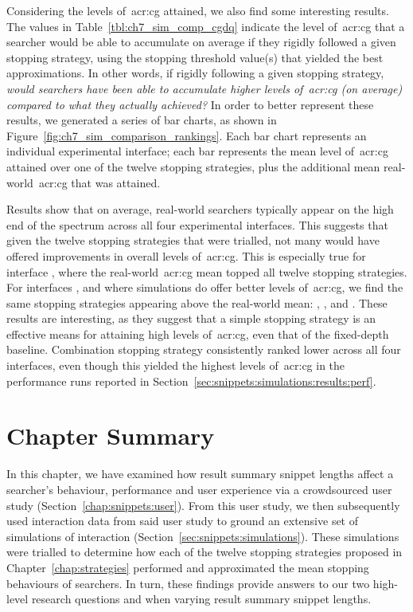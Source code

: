 Considering the levels of~\gls{acr:cg} attained, we also find some interesting results. The values in Table~\ref{tbl:ch7_sim_comp_cgdq} indicate the level of~\gls{acr:cg} that a searcher would be able to accumulate on average if they rigidly followed a given stopping strategy, using the stopping threshold value(s) that yielded the best approximations. In other words, if rigidly following a given stopping strategy, \emph{would searchers have been able to accumulate higher levels of~\gls{acr:cg} (on average) compared to what they actually achieved?} In order to better represent these results, we generated a series of bar charts, as shown in Figure~\ref{fig:ch7_sim_comparison_rankings}. Each bar chart represents an individual experimental interface; each bar represents the mean level of~\gls{acr:cg} attained over one of the twelve stopping strategies, plus the additional mean real-world~\gls{acr:cg} that was attained.

Results show that on average, real-world searchers typically appear on the high end of the spectrum across all four experimental interfaces. This suggests that given the twelve stopping strategies that were trialled, not many would have offered improvements in overall levels of~\gls{acr:cg}. This is especially true for interface , where the real-world~\gls{acr:cg} mean topped all twelve stopping strategies. For interfaces ,  and  where simulations do offer better levels of~\gls{acr:cg}, we find the same stopping strategies appearing above the real-world mean: , ,  and . These results are interesting, as they suggest that a simple stopping strategy is an effective means for attaining high levels of~\gls{acr:cg}, even that of the fixed-depth baseline. Combination stopping strategy  consistently ranked lower across all four interfaces, even though this yielded the highest levels of~\gls{acr:cg} in the performance runs reported in Section~\ref{sec:snippets:simulations:results:perf}.

\section{Chapter Summary}
In this chapter, we have examined how result summary snippet lengths affect a searcher's behaviour, performance and user experience via a crowdsourced user study (Section~\ref{chap:snippets:user}). From this user study, we then subsequently used interaction data from said user study to ground an extensive set of simulations of interaction (Section~\ref{sec:snippets:simulations}). These simulations were trialled to determine how each of the twelve stopping strategies proposed in Chapter~\ref{chap:strategies} performed and approximated the mean stopping behaviours of searchers. In turn, these findings provide answers to our two high-level research questions  and  when varying result summary snippet lengths.

